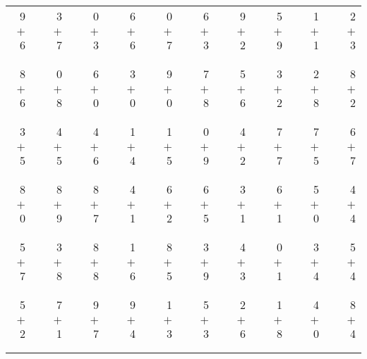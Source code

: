 \documentclass[12pt, letterpaper]{article}
\begin{document}
\begin{tabular}{rrrrrrrrrrrrrrrrrrr}
9 & & 3 & & 0 & & 6 & & 0 & & 6 & & 9 & & 5 & & 1 & & 2\\
$+$ 6 & & $+$ 7 & & $+$ 3 & & $+$ 6 & & $+$ 7 & & $+$ 3 & & $+$ 2 & & $+$ 9 & & $+$ 1 & & $+$ 3\\
\cline{1-1} \cline{3-3} \cline{5-5} \cline{7-7} \cline{9-9} \cline{11-11} \cline{13-13} \cline{15-15} \cline{17-17} \cline{19-19} \\ \\
8 & & 0 & & 6 & & 3 & & 9 & & 7 & & 5 & & 3 & & 2 & & 8\\
$+$ 6 & & $+$ 8 & & $+$ 0 & & $+$ 0 & & $+$ 0 & & $+$ 8 & & $+$ 6 & & $+$ 2 & & $+$ 8 & & $+$ 2\\
\cline{1-1} \cline{3-3} \cline{5-5} \cline{7-7} \cline{9-9} \cline{11-11} \cline{13-13} \cline{15-15} \cline{17-17} \cline{19-19} \\ \\
3 & & 4 & & 4 & & 1 & & 1 & & 0 & & 4 & & 7 & & 7 & & 6\\
$+$ 5 & & $+$ 5 & & $+$ 6 & & $+$ 4 & & $+$ 5 & & $+$ 9 & & $+$ 2 & & $+$ 7 & & $+$ 5 & & $+$ 7\\
\cline{1-1} \cline{3-3} \cline{5-5} \cline{7-7} \cline{9-9} \cline{11-11} \cline{13-13} \cline{15-15} \cline{17-17} \cline{19-19} \\ \\
8 & & 8 & & 8 & & 4 & & 6 & & 6 & & 3 & & 6 & & 5 & & 4\\
$+$ 0 & & $+$ 9 & & $+$ 7 & & $+$ 1 & & $+$ 2 & & $+$ 5 & & $+$ 1 & & $+$ 1 & & $+$ 0 & & $+$ 4\\
\cline{1-1} \cline{3-3} \cline{5-5} \cline{7-7} \cline{9-9} \cline{11-11} \cline{13-13} \cline{15-15} \cline{17-17} \cline{19-19} \\ \\
5 & & 3 & & 8 & & 1 & & 8 & & 3 & & 4 & & 0 & & 3 & & 5\\
$+$ 7 & & $+$ 8 & & $+$ 8 & & $+$ 6 & & $+$ 5 & & $+$ 9 & & $+$ 3 & & $+$ 1 & & $+$ 4 & & $+$ 4\\
\cline{1-1} \cline{3-3} \cline{5-5} \cline{7-7} \cline{9-9} \cline{11-11} \cline{13-13} \cline{15-15} \cline{17-17} \cline{19-19} \\ \\
5 & & 7 & & 9 & & 9 & & 1 & & 5 & & 2 & & 1 & & 4 & & 8\\
$+$ 2 & & $+$ 1 & & $+$ 7 & & $+$ 4 & & $+$ 3 & & $+$ 3 & & $+$ 6 & & $+$ 8 & & $+$ 0 & & $+$ 4\\
\cline{1-1} \cline{3-3} \cline{5-5} \cline{7-7} \cline{9-9} \cline{11-11} \cline{13-13} \cline{15-15} \cline{17-17} \cline{19-19} \\ \\

\end{tabular}
\end{document}
